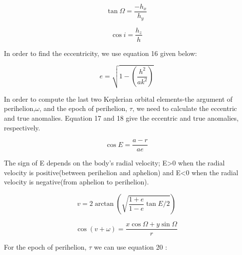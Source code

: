 \documentclass[letterpaper,12pt]{article}
\begin{document}
\begin{equation}
\tan \Omega = \frac{-h_{x}}{h_{y}}
\end{equation}

\begin{equation}
\cos i = \frac{h_{z}}{h}
\end{equation}

In order to find the eccentricity, we use equation 16 given below:

\begin{equation}
e=\sqrt{1-(\frac{h^2}{ak^2})}
\end{equation}

In order to compute the last two Keplerian orbital elements-the argument of perihelion,\begin{math} \omega \end{math}, and the epoch of perihelion, \begin{math} \tau \end{math}, we need to calculate the eccentric and true anomalies. Equation 17 and 18 give the eccentric and true anomalies, respectively.

\begin{equation}
\cos E = \frac{a-r}{ae}
\end{equation}

The sign of E depends on the body's radial velocity; E>0 when the radial velocity is positive(between perihelion and aphelion) and E<0 when the radial velocity is negative(from aphelion to perihelion).

\begin{equation}
v = 2\arctan(\sqrt{\frac{1+e}{1-e}\tan E/2})
\end{equation}

\begin{equation}
\cos (v+\omega) = \frac{x \cos \Omega + y \sin \Omega}{r} 
\end{equation}


For the epoch of perihelion, \begin{math} \tau \end{math} we can use equation 20 :
\end{document}
